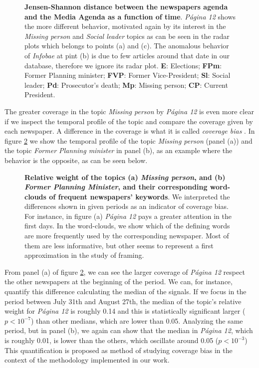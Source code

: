 \documentclass[10pt,letterpaper]{article}
\begin{document}
\begin{figure}[h!]
\centering
\caption{\textbf{Jensen-Shannon distance between the newspapers agenda and the Media Agenda as a function of time}. \emph{P\'agina 12} shows the more different behavior, motivated again by its interest in the \emph{Missing person} and \emph{Social leader} topics as can be seen in the radar plots which belongs to points (a) and (c). The anomalous behavior of \emph{Infobae} at pint (b) is due to few articles around that date in our database, therefore we ignore its radar plot. \textbf{E}: Elections; \textbf{FPm}: Former Planning minister; \textbf{FVP}: Former Vice-President; \textbf{Sl}: Social leader; \textbf{Pd}: Prosecutor's death; \textbf{Mp}: Missing person; \textbf{CP}: Current President.}
\label{fig:jensen_shannon_news}
\end{figure}


\par The greater coverage in the topic \emph{Missing person} by \emph{P\'agina 12} is even more clear if we inspect the temporal profile of the topic and compare the coverage given by each newspaper. A difference in the coverage is what it is called \emph{coverage bias} \cite{dallmann2015media}.  In figure \ref{fig:topics_temporal_profiles} we show the temporal profile of the topic \emph{Missing person} (panel (a)) and the topic \emph{Former Planning minister} in panel (b), as an example where the behavior is the opposite, as can be seen below.

\begin{figure}[h!]
\centering
\caption{\textbf{Relative weight of the topics (a) \emph{Missing person}, and (b) \emph{Former Planning Minister}, and their corresponding word-clouds of frequent newspapers' keywords}. We interpreted the differences shown in given periods as an indicator of coverage bias. For instance, in figure (a) \emph{P\'agina 12} pays a greater attention in the first days. In the word-clouds, we show which of the defining words are more frequently used by the corresponding newspaper. Most of them are less informative, but other seems to represent a first approximation in the study of framing.}
\label{fig:topics_temporal_profiles}
\end{figure}

\par From panel (a) of figure \ref{fig:topics_temporal_profiles}, we can see the larger coverage of \emph{P\'agina 12} respect the other newspapers at the beginning of the period. We can, for instance, quantify this difference calculating  the median of the signals. If we focus in the period between July 31th and August 27th, the median of the topic's relative weight for \emph{P\'agina 12} is roughly 0.14 and this is statistically significant larger ($p < 10^{-7}$) than other medians, which are lower than 0.05.
Analyzing the same period, but in panel (b), we again can show that the median in \emph{P\'agina 12}, which is roughly 0.01, is lower than the others, which oscillate around 0.05 ($p<10^{-3}$)
This quantification is proposed as method of studying coverage bias in the context of the methodology implemented in our work. 
\end{document}
